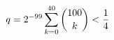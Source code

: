 \documentclass[preview]{standalone}
\begin{document}
\begin{align*}
\special{dvisvgm:raw <g id='unique000'>}q=2^{-99}\sum_{k=0}^{40}\binom{100}{k}<\frac14\special{dvisvgm:raw </g>}
\end{align*}
\end{document}
